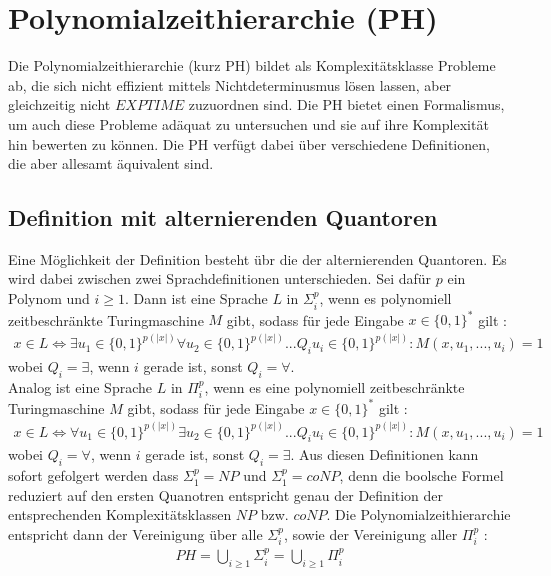 \chapter{Polynomialzeithierarchie (PH)} \label{chapter: Polynomialzeithierarchie (PH)}
Die Polynomialzeithierarchie (kurz PH) bildet als Komplexitätsklasse Probleme ab, die sich nicht effizient mittels Nichtdeterminusmus lösen lassen, aber gleichzeitig 
nicht $EXPTIME$ zuzuordnen sind. Die PH bietet einen Formalismus, um auch diese Probleme adäquat zu untersuchen und sie auf ihre Komplexität hin bewerten zu können.
Die PH verfügt dabei über verschiedene Definitionen, die aber allesamt äquivalent sind.


\section{Definition mit alternierenden Quantoren} \label{section: Definition PH mit alternierenden Quantoren}
Eine Möglichkeit der Definition besteht übr die der alternierenden Quantoren. Es wird dabei zwischen zwei Sprachdefinitionen unterschieden.
Sei dafür $p$ ein Polynom und $i \geq 1$. Dann ist eine Sprache $L$ in $\Sigma^p_i$, wenn es polynomiell zeitbeschränkte Turingmaschine $M$ gibt, 
sodass für jede Eingabe $x \in \{0,1\}^*$ gilt \cite{rossman_complexity_2015}:
\begin{align*}
    x \in L \Leftrightarrow \exists u_1 \in \{0,1\}^{p(|x|)} \forall u_2 \in \{0,1\}^{p(|x|)} ... Q_i u_i \in \{0,1\}^{p(|x|)} : M(x, u_1, ..., u_i) = 1
\end{align*}
wobei $Q_i = \exists$, wenn $i$ gerade ist, sonst $Q_i = \forall$. \\
Analog ist eine Sprache $L$ in $\Pi^p_i$, wenn es eine polynomiell zeitbeschränkte Turingmaschine $M$ gibt, sodass für jede Eingabe $x \in \{0,1\}^*$ gilt \cite{arora_computational_2009}:
\begin{align*}
    x \in L \Leftrightarrow \forall u_1 \in \{0,1\}^{p(|x|)} \exists u_2 \in \{0,1\}^{p(|x|)} ... Q_i u_i \in \{0,1\}^{p(|x|)} : M(x, u_1, ..., u_i) = 1
\end{align*}
wobei $Q_i = \forall$, wenn $i$ gerade ist, sonst $Q_i = \exists$.
Aus diesen Definitionen kann sofort gefolgert werden dass $\Sigma^p_1 = NP$ und $\Sigma^p_1 = coNP$, denn die boolsche Formel reduziert auf 
den ersten Quanotren entspricht genau der Definition der entsprechenden Komplexitätsklassen $NP$ bzw. $coNP$.
Die Polynomialzeithierarchie entspricht dann der Vereinigung über alle $\Sigma^p_i$, sowie der Vereinigung aller $\Pi^p_i$ \cite{sipser_introduction_2012}:
\begin{align*}
    PH = \bigcup_{i \geq 1} \Sigma^p_i = \bigcup_{i \geq 1} \Pi^p_i 
\end{align*}
